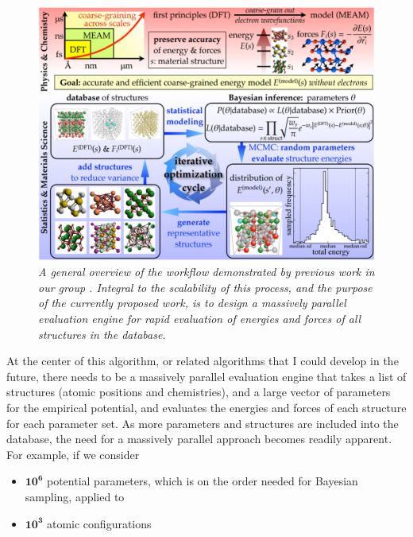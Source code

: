 \documentclass[11pt]{article}
\begin{document}
\begin{figure}
  \begin{minipage}[t]{0.65\linewidth}
    \vskip0pt
    \includegraphics[width=\textwidth]{workflow.png}
  \end{minipage}
  \hfill
  \begin{minipage}[t]{0.3\linewidth}
    \caption{\label{fig:workflow}
      \textit{A general overview of the workflow demonstrated by previous work in our group \cite{dbopt}. Integral to the scalability of this process, and the purpose of the currently proposed work, is to design a massively parallel evaluation engine for rapid evaluation of energies and forces of all structures in the database.}}
  \end{minipage}
\end{figure}

At the center of this algorithm, or related algorithms that I could develop in the future, there needs to be a massively parallel evaluation engine that takes a list of structures (atomic positions and chemistries), and a large vector of parameters for the empirical potential, and evaluates the energies and forces of each structure for each parameter set. As more parameters and structures are included into the database, the need for a massively parallel approach becomes readily apparent. For example, if we consider

\begin{itemize}
    \item $\mathbf{10^6}$ potential parameters, which is on the order needed for Bayesian sampling, applied to
    \item $\mathbf{10^3}$ atomic configurations
\end{itemize}
\end{document}
